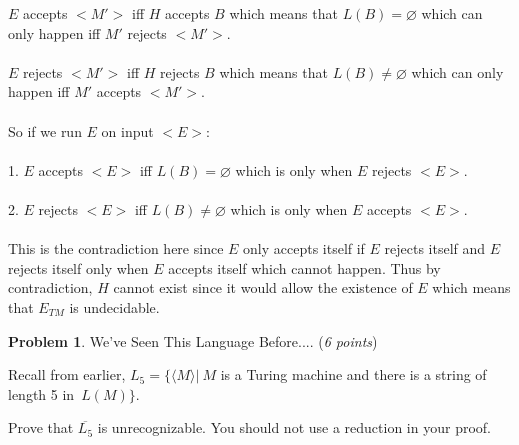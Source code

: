 \documentclass[11pt]{article}
\theoremstyle{definition}
\theoremstyle{theorem}
\newtheorem{prob}{Problem}
\newcommand{\solution}{\medskip\noindent{\color{blue}\textbf{Solution:}}}
\begin{document}
\noindent $E$ accepts $<M'>$ iff $H$ accepts $B$ which means that $L(B) = \varnothing$ which can only happen iff $M'$ rejects $<M'>$. \\~\\
\noindent $E$ rejects $<M'>$ iff $H$ rejects $B$ which means that $L(B) \neq \varnothing$ which can only happen iff $M'$ accepts $<M'>$. \\~\\
So if we run $E$ on input $<E>$: \\~\\
1. $E$ accepts $<E>$ iff $L(B) = \varnothing$ which is only when $E$ rejects $<E>$. \\~\\
2. $E$ rejects $<E>$ iff $L(B) \neq \varnothing$ which is only when $E$ accepts $<E>$. \\~\\
\noindent This is the contradiction here since $E$ only accepts itself if $E$ rejects itself and $E$ rejects itself only when $E$ accepts itself which cannot happen. Thus by contradiction, $H$ cannot exist since it would allow the existence of $E$ which means that $E_{TM}$ is undecidable. 



\newpage

\begin{prob} We've Seen This Language Before.... (\emph{6 points})\end{prob}

Recall from earlier, $L_{5} = \{\langle M \rangle | ~M $  is a Turing machine and there is a string of length 5 in~$ L(M)\}$.

Prove that $\overline{L_{5}}$ is unrecognizable. You should not use a reduction in your proof.



\solution
\end{document}
